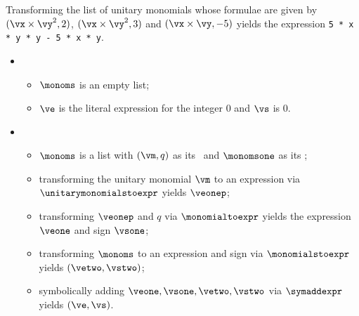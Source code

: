 
Transforming the list of unitary monomials whose formulae are given by
$(\vx \times \vy^2, 2)$,
$(\vx \times \vy^2, 3)$ and $(\vx \times \vy, -5)$
yields the expression \verb|5 * x * y * y - 5 * x * y|.

\ProseParagraph
\OneApplies
\begin{itemize}
  \item {}
  \begin{itemize}
    \item $\monoms$ is an empty list;
    \item $\ve$ is the literal expression for the integer $0$ and $\vs$ is $0$.
  \end{itemize}

  \item {}
  \begin{itemize}
    \item $\monoms$ is a list with $(\vm,q)$ as its \head\ and $\monomsone$ as its \tail;
    \item transforming the unitary monomial $\vm$ to an expression via \\ $\unitarymonomialstoexpr$ yields $\veonep$;
    \item transforming $\veonep$ and $q$ via $\monomialtoexpr$ yields the expression $\veone$ and sign $\vsone$;
    \item transforming $\monoms$ to an expression and sign via $\monomialstoexpr$ yields $(\vetwo, \vstwo)$;
    \item symbolically adding $\veone, \vsone, \vetwo, \vstwo$ via $\symaddexpr$ yields $(\ve, \vs)$.
  \end{itemize}
\end{itemize}

\FormallyParagraph
{}

